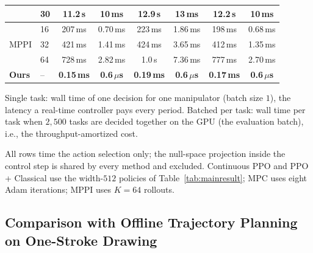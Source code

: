 \documentclass[journal, twoside]{IEEEtran}
\begin{document}
\begin{table}[!htbp]
\begin{threeparttable}
\begin{tabular}{llcccccc}
  & 30 & 11.2\,s & 10\,ms & 12.9\,s & 13\,ms & 12.2\,s & 10\,ms \\
\midrule
\multirow{3}{*}{MPPI} & 16 & 207\,ms & 0.70\,ms & 223\,ms & 1.86\,ms & 198\,ms & 0.68\,ms \\
  & 32 & 421\,ms & 1.41\,ms & 424\,ms & 3.65\,ms & 412\,ms & 1.35\,ms \\
  & 64 & 728\,ms & 2.82\,ms & 1.0\,s & 7.36\,ms & 777\,ms & 2.70\,ms \\
\midrule
\textbf{Ours} & -- & \textbf{0.15\,ms} & \textbf{0.6\,$\mu$s} & \textbf{0.19\,ms} & \textbf{0.6\,$\mu$s} & \textbf{0.17\,ms} & \textbf{0.6\,$\mu$s} \\
\bottomrule
\end{tabular}
\begin{tablenotes}
    \item[Note 1] Single task: wall time of one decision for one
    manipulator (batch size $1$), the latency a real-time controller pays
    every period. Batched per task: wall time per task when $2{,}500$
    tasks are decided together on the GPU (the evaluation batch), i.e.,
    the throughput-amortized cost.
    \item[Note 2] All rows time the action selection only; the
    null-space projection inside the control step is shared by every
    method and excluded. Continuous PPO and PPO + Classical use the
    width-$512$ policies of Table~\ref{tab:mainresult}; MPC uses eight
    Adam iterations; MPPI uses $K=64$ rollouts.
\end{tablenotes}
\end{threeparttable}
\end{table}

\subsection{Comparison with Offline Trajectory Planning on One-Stroke Drawing}
\label{sec:onestroke}
\end{document}
